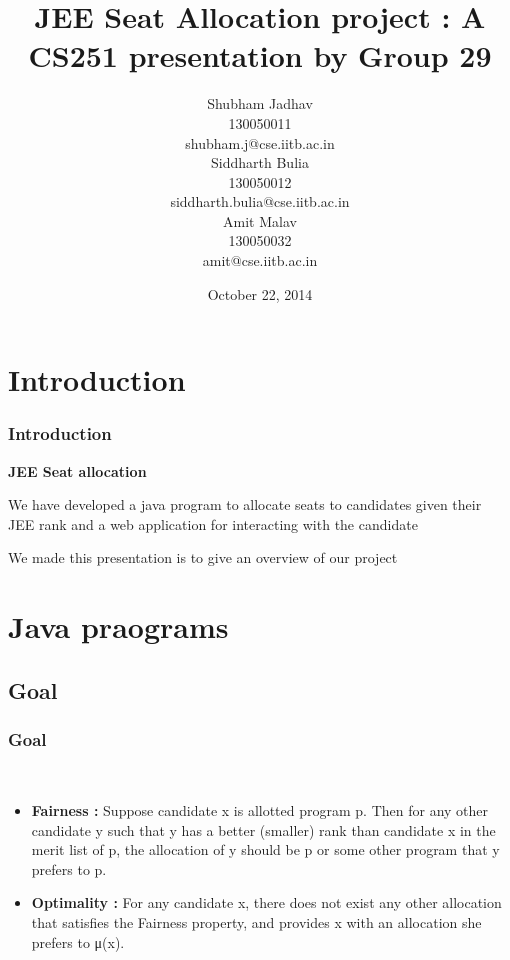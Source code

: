 \documentclass{beamer}
\title{JEE Seat Allocation project : A CS251 presentation by Group 29}
\author{Shubham Jadhav \\
{\tiny 130050011}  \\
	{\tiny shubham.j@cse.iitb.ac.in}  \\
    Siddharth Bulia \\
    {\tiny 130050012}  \\
   { \tiny siddharth.bulia@cse.iitb.ac.in } \\
    Amit Malav  \\
    {\tiny 130050032}  \\
    {\tiny amit@cse.iitb.ac.in}
}
\date{October 22, 2014}
\begin{document}
\begin{frame}
\titlepage
\end{frame}

\section{Introduction}

\begin{frame}
\frametitle{Introduction}
\begin{center}
 {\bf JEE Seat allocation } 

\end{center}
\vskip 0.5in
\pause
We have developed a java program to allocate seats to candidates given their JEE rank and a web application for interacting with the candidate \\
\pause 

We made this presentation is to give an overview of our project

\end{frame}






\section{Java praograms}
\subsection {Goal}
\begin {frame}
\frametitle{Goal}
\pause
\\
\begin{itemize}
\item {\bf Fairness : } Suppose candidate x is allotted program p. Then for any other candidate y such that y has a better (smaller) rank than candidate x in the merit list of p, the allocation of y should be p or some other program that y prefers to p.
\pause
\item {\bf Optimality :} For any candidate x, there does not exist any other allocation that satisfies the Fairness property, and provides x with an allocation she prefers to μ(x).
\end{itemize}
\end{frame}
\end{document}
